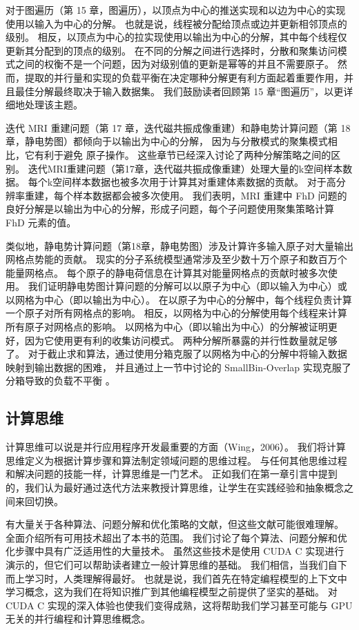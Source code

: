 对于图遍历（第 15 章，图遍历），以顶点为中心的推送实现和以边为中心的实现使用以输入为中心的分解。 
也就是说，线程被分配给顶点或边并更新相邻顶点的级别。 
相反，以顶点为中心的拉实现使用以输出为中心的分解，其中每个线程仅更新其分配到的顶点的级别。 
在不同的分解之间进行选择时，分散和聚集访问模式之间的权衡不是一个问题，因为对级别值的更新是幂等的并且不需要原子。 
然而，提取的并行量和实现的负载平衡在决定哪种分解更有利方面起着重要作用，并且最佳分解最终取决于输入数据集。 
我们鼓励读者回顾第 15 章“图遍历”，以更详细地处理该主题。

迭代 MRI 重建问题（第 17 章，迭代磁共振成像重建）和静电势计算问题（第 18 章，静电势图）都倾向于以输出为中心的分解，
因为与分散模式的聚集模式相比，它有利于避免 原子操作。 这些章节已经深入讨论了两种分解策略之间的区别。 
迭代MRI重建问题（第17章，迭代磁共振成像重建）处理大量的k空间样本数据。 
每个k空间样本数据也被多次用于计算其对重建体素数据的贡献。 对于高分辨率重建，每个样本数据都会被多次使用。 
我们表明，MRI 重建中 FhD 问题的良好分解是以输出为中心的分解，形成子问题，每个子问题使用聚集策略计算 FhD 元素的值。

类似地，静电势计算问题（第18章，静电势图）涉及计算许多输入原子对大量输出网格点势能的贡献。 
现实的分子系统模型通常涉及至少数十万个原子和数百万个能量网格点。 
每个原子的静电荷信息在计算其对能量网格点的贡献时被多次使用。 
我们证明静电势图计算问题的分解可以以原子为中心（即以输入为中心）或以网格为中心（即以输出为中心）。 
在以原子为中心的分解中，每个线程负责计算一个原子对所有网格点的影响。 
相反，以网格为中心的分解使用每个线程来计算所有原子对网格点的影响。 
以网格为中心（即以输出为中心）的分解被证明更好，因为它使用更有利的收集访问模式。 两种分解所暴露的并行性数量就足够了。 
对于截止求和算法，通过使用分箱克服了以网格为中心的分解中将输入数据映射到输出数据的困难，
并且通过上一节中讨论的 SmallBin-Overlap 实现克服了分箱导致的负载不平衡 。

\subsection{计算思维}
计算思维可以说是并行应用程序开发最重要的方面（Wing，2006）。 
我们将计算思维定义为根据计算步骤和算法制定领域问题的思维过程。 
与任何其他思维过程和解决问题的技能一样，计算思维是一门艺术。 
正如我们在第一章引言中提到的，我们认为最好通过迭代方法来教授计算思维，让学生在实践经验和抽象概念之间来回切换。

有大量关于各种算法、问题分解和优化策略的文献，但这些文献可能很难理解。 全面介绍所有可用技术超出了本书的范围。 
我们讨论了每个算法、问题分解和优化步骤中具有广泛适用性的大量技术。 
虽然这些技术是使用 CUDA C 实现进行演示的，但它们可以帮助读者建立一般计算思维的基础。 
我们相信，当我们自下而上学习时，人类理解得最好。 
也就是说，我们首先在特定编程模型的上下文中学习概念，这为我们在将知识推广到其他编程模型之前提供了坚实的基础。 
对 CUDA C 实现的深入体验也使我们变得成熟，这将帮助我们学习甚至可能与 GPU 无关的并行编程和计算思维概念。

